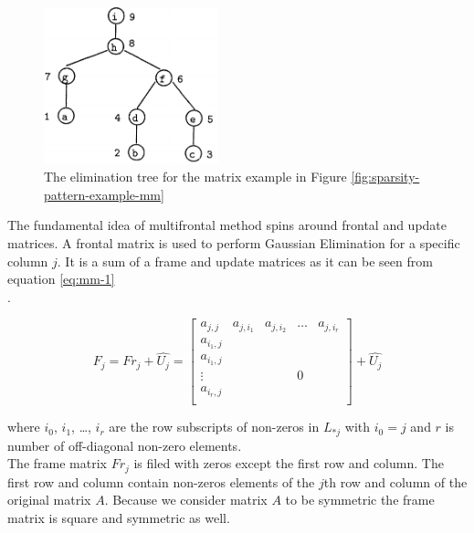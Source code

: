 \figpointer{\ref{fig:elimination-tree-mm}}

\begin{figure}[htpb]
  \centering
  \includegraphics[width=0.45\textwidth]{figures/chapter-2/elimination-tree-mm.png}
\caption{The elimination tree for the matrix example in Figure \ref{fig:sparsity-pattern-example-mm}
 \cite{mult-frontal-original:2}}
\label{fig:elimination-tree-mm}
\end{figure}


The fundamental idea of multifrontal method spins around frontal and update matrices. A frontal matrix is used to perform Gaussian Elimination for a specific column $j$. It is a sum of a frame and update matrices as it can be seen from equation \ref{eq:mm-1}\\.

\begin{equation} \label{eq:mm-1}
	F_{j} = Fr_{j} + \hat{U_{j}} = \begin{bmatrix}a_{j,j} & a_{j,i_1} & a_{j,i_2} & \dots & a_{j,i_r} \\
a_{i_1,j} \\
a_{i_1,j} \\
\vdots & & & 0\\
a_{i_r,j} \\
\end{bmatrix} + \hat{U_{j}}
\end{equation}

where $i_{0}$, $i_{1}$, \dots , $i_{r}$ are the row subscripts of non-zeros in $L_{*j}$ with $i_{0} = j$ and $r$ is number of off-diagonal non-zero elements.\\

The frame matrix $Fr_{j}$ is filed with zeros except the first row and column. The first row and column contain non-zeros elements of the $j$th row and column of the original matrix $A$. Because we consider matrix $A$ to be symmetric the frame matrix is square and symmetric as well.\\

